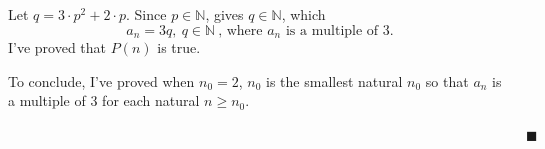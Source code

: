 \documentclass[12pt]{article}
\begin{document}
\begin{enumerate}[label=(\alph*)]
    Let $q=3\cdot p^2 + 2\cdot p$.
    Since $p \in \mathbb{N}$, gives $q \in \mathbb{N}$, which $$a_n = 3q,\ q \in \mathbb{N}\ \text{, where $a_n$ is a multiple of 3.}$$
    I've proved that $P(n)$ is true.

    To conclude, I've proved when $n_0 = 2$, $n_0$ is the smallest natural $n_0$ so that $a_n$ is a multiple of 3 for each natural $ n \geq n_0$.

    $\quad \quad \quad \quad \quad \quad \quad \quad \quad \quad \quad \quad \quad \quad \quad \quad \quad \quad \quad \quad \quad \quad \quad \quad \quad \quad \quad \quad \quad \quad \quad \quad \quad \quad \quad \quad \quad \blacksquare $
\end{enumerate}
\end{document}
